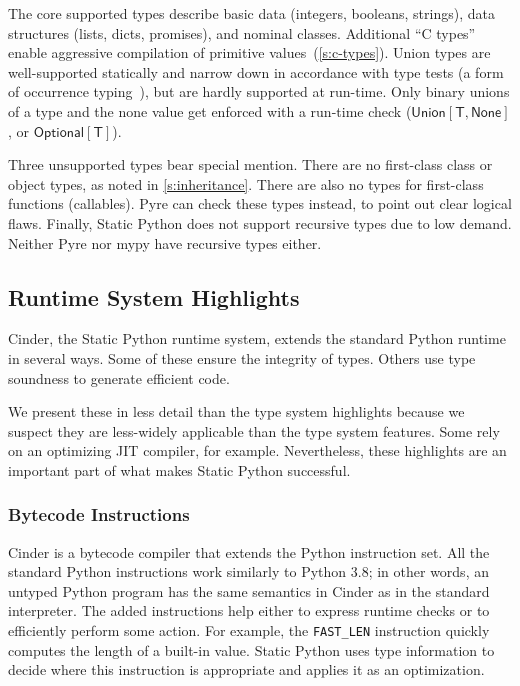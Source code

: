 \documentclass[english,cleveref,submission]{programming}
\newcommand{\SP}{Static Python}
\newcommand{\code}[1]{\texttt{#1}}
\newcommand{\typefont}[1]{\mathsf{#1}}
\newcommand{\paramtype}[2]{#1[#2]}
\newcommand{\sptype}{\typefont{T}}
\newcommand{\sptnone}{\typefont{None}}
\newcommand{\sptoptional}[1]{\paramtype{\typefont{Optional}}{#1}}
\newcommand{\sptunion}[1]{\paramtype{\typefont{Union}}{#1}}
\begin{document}
The core supported types describe basic data (integers, booleans, strings),
data structures (lists, dicts, promises),
and nominal classes.
Additional ``C types'' enable aggressive compilation of primitive
values~(\cref{s:c-types}).
Union types are well-supported statically and narrow down in accordance
with type tests (a form of occurrence typing~\cite{tf-icfp-2010,gsk-esop-2011}),
but are hardly supported at run-time.
Only binary unions of a type and the none value get enforced with a run-time check
($\sptunion{\sptype, \sptnone}$, or $\sptoptional{\sptype}$).

Three unsupported types bear special mention.
There are no first-class class or object types, as noted in \cref{s:inheritance}.
There are also no types for first-class functions (callables).
Pyre can check these types instead, to point out clear logical flaws.
Finally, \SP{} does not support recursive types due to low demand.
Neither Pyre nor mypy have recursive types either.


\subsection{Runtime System Highlights}

Cinder, the \SP{} runtime system, extends the standard Python runtime in
several ways.
Some of these ensure the integrity of types.
Others use type soundness to generate efficient code.

We present these in less detail than the type system highlights because
we suspect they are less-widely applicable than the type system features.
Some rely on an optimizing JIT compiler, for example.
Nevertheless, these highlights are an important part of what makes \SP{} successful.


\subsubsection{Bytecode Instructions}

Cinder is a bytecode compiler that extends the Python instruction set.
All the standard Python instructions work similarly to Python 3.8;
in other words, an untyped Python program has the same semantics in
Cinder as in the standard interpreter.
The added instructions help either to express runtime checks or to
efficiently perform some action.
For example, the \code{FAST\_LEN} instruction quickly computes the
length of a built-in value.
\SP{} uses type information to decide where this instruction is appropriate
and applies it as an optimization.
\end{document}
